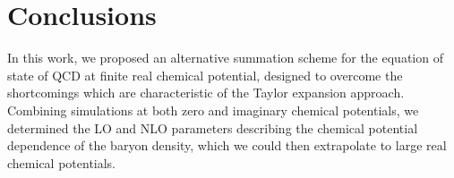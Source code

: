 \documentclass[aps,prd,twocolumn,superscriptaddress]{revtex4-2}
\newcommand \hmu {\hat{\mu}}
\begin{document}
%
%
%
%
%
%
%

\section{Conclusions\label{sec:conclusions}}

In this work, we proposed an alternative summation scheme for the equation
of state of QCD at finite real chemical potential, designed to overcome the 
shortcomings which are characteristic of the Taylor expansion approach. Combining
simulations at both zero and imaginary chemical potentials, we determined 
the LO and NLO parameters describing the chemical potential dependence of the 
baryon density, which we could then extrapolate to large real chemical potentials.
\end{document}
